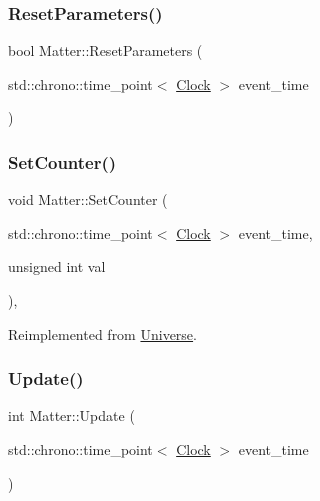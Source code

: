 \mbox{\label{classMatter_adfd93d323e43d09fa8d8b7cdd2258611}} 
\subsubsection{\texorpdfstring{Reset\+Parameters()}{ResetParameters()}}
{\footnotesize\ttfamily bool Matter\+::\+Reset\+Parameters (\begin{DoxyParamCaption}\item[{std\+::chrono\+::time\+\_\+point$<$ \mbox{\hyperlink{universe_8h_a0ef8d951d1ca5ab3cfaf7ab4c7a6fd80}{Clock}} $>$}]{event\+\_\+time }\end{DoxyParamCaption})}

\mbox{\label{classMatter_a514b4a64589eb3fbc3db6b3b356bd687}} 
\subsubsection{\texorpdfstring{Set\+Counter()}{SetCounter()}}
{\footnotesize\ttfamily void Matter\+::\+Set\+Counter (\begin{DoxyParamCaption}\item[{std\+::chrono\+::time\+\_\+point$<$ \mbox{\hyperlink{universe_8h_a0ef8d951d1ca5ab3cfaf7ab4c7a6fd80}{Clock}} $>$}]{event\+\_\+time,  }\item[{unsigned int}]{val }\end{DoxyParamCaption})\hspace{0.3cm}{\ttfamily [inline]}, {\ttfamily [virtual]}}



Reimplemented from \mbox{\hyperlink{classUniverse_aa22202ae740eb1355529afcb13285e91}{Universe}}.

\mbox{\label{classMatter_a56898dd51e5a675832bc82de285b3ef7}} 
\subsubsection{\texorpdfstring{Update()}{Update()}}
{\footnotesize\ttfamily int Matter\+::\+Update (\begin{DoxyParamCaption}\item[{std\+::chrono\+::time\+\_\+point$<$ \mbox{\hyperlink{universe_8h_a0ef8d951d1ca5ab3cfaf7ab4c7a6fd80}{Clock}} $>$}]{event\+\_\+time }\end{DoxyParamCaption})}



